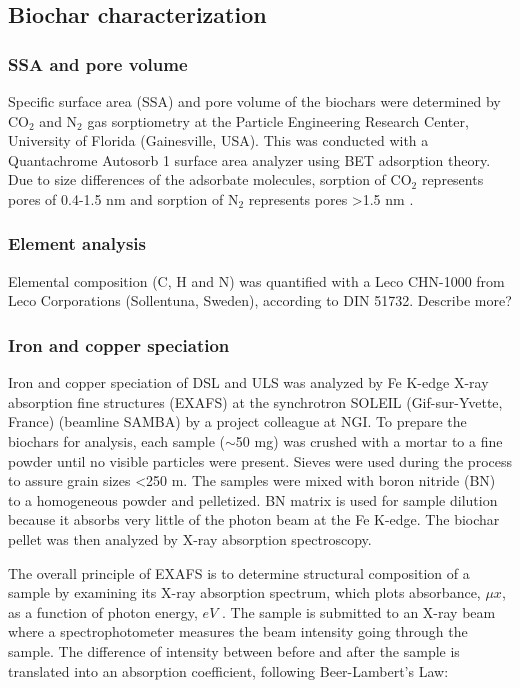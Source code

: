 \subsection{Biochar characterization}

\subsubsection{SSA and pore volume}
Specific surface area (SSA) and pore volume of the biochars were determined by $\mathrm{CO_2}$ and $\mathrm{N_2}$ gas sorptiometry at the Particle Engineering Research Center, University of Florida (Gainesville, USA). This was conducted with a Quantachrome Autosorb 1 surface area analyzer using BET adsorption theory. Due to size differences of the adsorbate molecules, sorption of $\mathrm{CO_2}$ represents pores of 0.4-1.5 nm and sorption of $\mathrm{N_2}$ represents pores \textgreater 1.5 nm  \citep{kwon2005}. 

\subsubsection{Element analysis}
Elemental composition (C, H and N) was quantified with a Leco CHN-1000 from Leco Corporations (Sollentuna, Sweden), according to DIN 51732. Describe more? 

\subsubsection{Iron and copper speciation}
Iron and copper speciation of DSL and ULS was analyzed by Fe K-edge X-ray absorption fine structures (EXAFS) at the synchrotron SOLEIL (Gif-sur-Yvette, France) (beamline SAMBA) by a project colleague at NGI. To prepare the biochars for analysis, each sample ($\sim$50 mg) was crushed with a mortar to a fine powder until no visible particles were present. Sieves were used during the process to assure grain sizes \textless 250 \textmu m. The samples were mixed with boron nitride (BN) to a homogeneous powder and pelletized. BN matrix is used for sample dilution because it absorbs very little of the photon beam at the Fe K-edge. The biochar pellet was then analyzed by X-ray absorption spectroscopy.  

The overall principle of EXAFS is to determine structural composition of a sample by examining its X-ray absorption spectrum, which plots absorbance, $\mu x$, as a function of photon energy, $eV$ \citep{vlaica2004exafs}. The sample is submitted to an X-ray beam where a spectrophotometer measures the beam intensity going through the sample. The difference of intensity between before and after the sample is translated into an absorption coefficient, following Beer-Lambert's Law: 

